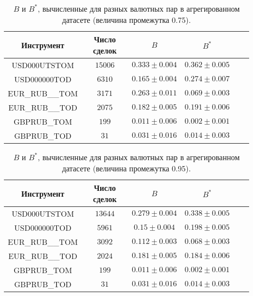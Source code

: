 \begin{table}[h!]
    \begin{center}
        \begin{tabular}{|c|c|c|c|c|c|}
            \hline
            Инструмент      & Число сделок & $B$               & $B ^*$            \\ \hline
            USD000UTSTOM    & $15006$      & $0.333 \pm 0.004$ & $0.362 \pm 0.005$ \\ \hline
            USD000000TOD    & $6310$       & $0.165 \pm 0.004$ & $0.274 \pm 0.007$ \\ \hline
            EUR\_RUB\_\_TOM & $3171$       & $0.263 \pm 0.011$ & $0.069 \pm 0.003$ \\ \hline
            EUR\_RUB\_\_TOD & $2075$       & $0.182 \pm 0.005$ & $0.191 \pm 0.006$ \\ \hline
            GBPRUB\_TOM     & $199$        & $0.011 \pm 0.006$ & $0.002 \pm 0.001$ \\ \hline
            GBPRUB\_TOD     & $31$         & $0.031 \pm 0.016$ & $0.014 \pm 0.003$ \\ \hline
        \end{tabular}
    \end{center}
    \caption{$B$ и $B ^*$, вычисленные для разных валютных пар в агрегированном датасете (величина промежутка 0.75).}
    \label{Aggreg1CU}
\end{table}

\begin{table}[h!]
    \begin{center}
        \begin{tabular}{|c|c|c|c|c|c|}
            \hline
            Инструмент      & Число сделок & $B$               & $B ^*$            \\ \hline
            USD000UTSTOM    & $13644$ & $0.279 \pm 0.004$ & $0.338 \pm 0.005$ \\ \hline
            USD000000TOD    & $5961$  & $0.15 \pm 0.004$  & $0.198 \pm 0.005$ \\ \hline
            EUR\_RUB\_\_TOM & $3092$  & $0.112 \pm 0.003$ & $0.068 \pm 0.003$ \\ \hline
            EUR\_RUB\_\_TOD & $2024$  & $0.181 \pm 0.005$ & $0.184 \pm 0.006$ \\ \hline
            GBPRUB\_TOM     & $199$   & $0.011 \pm 0.006$ & $0.002 \pm 0.001$ \\ \hline
            GBPRUB\_TOD     & $31$    & $0.031 \pm 0.016$ & $0.014 \pm 0.003$ \\ \hline
        \end{tabular}
    \end{center}
    \caption{$B$ и $B ^*$, вычисленные для разных валютных пар в агрегированном датасете (величина промежутка 0.95).}
    \label{Aggreg1CU}
\end{table}

